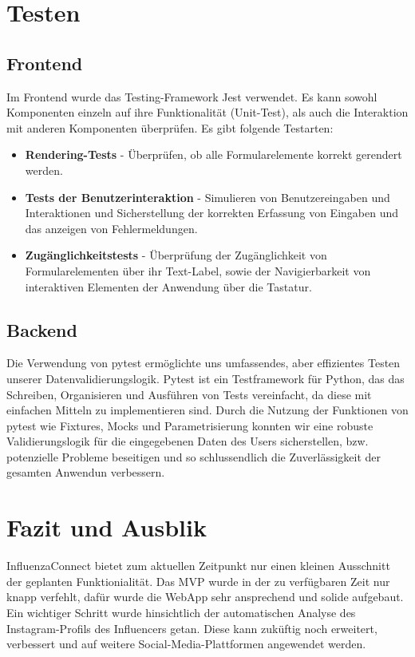 \documentclass[conference,a4paper,flushend]{cs-techrep}
\begin{document}
\section{Testen}
\subsection{Frontend}
Im Frontend wurde das Testing-Framework Jest verwendet. Es kann sowohl Komponenten einzeln auf ihre Funktionalität (Unit-Test), als auch die Interaktion mit anderen Komponenten überprüfen. Es gibt folgende Testarten:

\begin{itemize}
	\item{\textbf{Rendering-Tests} - Überprüfen, ob alle Formularelemente korrekt gerendert werden.}
	\item{\textbf{Tests der Benutzerinteraktion} - Simulieren von Benutzereingaben und Interaktionen und Sicherstellung der korrekten Erfassung von Eingaben und das anzeigen von Fehlermeldungen.}
	\item{\textbf{Zugänglichkeitstests} - Überprüfung der Zugänglichkeit von Formularelementen über ihr Text-Label, sowie der Navigierbarkeit von interaktiven Elementen der Anwendung über die Tastatur.}
\end{itemize}


\subsection{Backend}
Die Verwendung von pytest ermöglichte uns umfassendes, aber effizientes Testen unserer Datenvalidierungslogik. Pytest ist ein Testframework für Python, das das Schreiben, Organisieren und Ausführen von Tests vereinfacht, da diese mit einfachen Mitteln zu implementieren sind. Durch die Nutzung der Funktionen von pytest wie Fixtures, Mocks und Parametrisierung konnten wir eine robuste Validierungslogik für die eingegebenen Daten des Users sicherstellen, bzw. potenzielle Probleme beseitigen und so schlussendlich die Zuverlässigkeit der gesamten Anwendun verbessern. 



\section{Fazit und Ausblik}
InfluenzaConnect bietet zum aktuellen Zeitpunkt nur einen kleinen Ausschnitt der geplanten Funktionialität. Das MVP wurde in der zu verfügbaren Zeit nur knapp verfehlt, dafür wurde die WebApp sehr ansprechend und solide aufgebaut. Ein wichtiger Schritt wurde hinsichtlich der automatischen Analyse des Instagram-Profils des Influencers getan. Diese kann zuküftig noch erweitert, verbessert und auf weitere Social-Media-Plattformen angewendet werden. 
\end{document}

